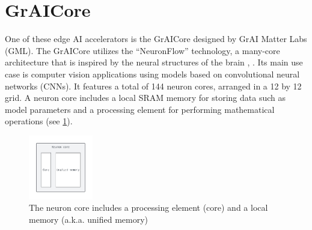 \section{GrAICore}

One of these edge AI accelerators is the GrAICore designed by GrAI Matter Labs (GML).
The GrAICore utilizes the ``NeuronFlow'' technology, a many-core architecture that is inspired by the neural structures of the brain \cite{moreiraNeuronFlowNeuromorphicProcessor2020}, \cite{moreira_neuronflow_2020}.
Its main use case is computer vision applications using models based on convolutional neural networks (CNNs).
It features a total of 144 neuron cores, arranged in a 12 by 12 grid.
A neuron core includes a local SRAM memory for storing data such as model parameters and a processing element for performing mathematical operations (see \cref{fig:neuron_core}).

\begin{figure}[htbp]
    \centering
    \includegraphics[width=0.25\textwidth]{assets/neuron_core.pdf}
    \caption{The neuron core includes a processing element (core) and a local memory (a.k.a. unified memory)}
    \label{fig:neuron_core}
\end{figure}

